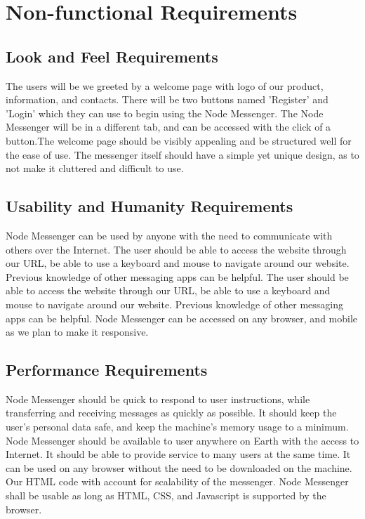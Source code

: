 \documentclass[12pt, titlepage]{article}
\begin{document}
    \section{Non-functional Requirements}

    	\subsection{Look and Feel Requirements}
    	The users will be we greeted by a welcome page with logo of our product, information, and contacts. There will be two buttons named 'Register' and 'Login' which they can use to begin using the Node Messenger. The Node Messenger will be in a different tab, and can be accessed with the click of a button.The welcome page should be visibly appealing and be structured well for the ease of use. The messenger itself should have a simple yet unique design, as to not make it cluttered and difficult to use.

    	\subsection{Usability and Humanity Requirements}
		Node Messenger can be used by anyone with the need to communicate with others over the Internet. The user should be able to access the website through our URL, be able to use a keyboard and mouse to navigate around our website. Previous knowledge of other messaging apps can be helpful. The user should be able to access the website through our URL, be able to use a keyboard and mouse to navigate around our website. Previous knowledge of other messaging apps can be helpful. Node Messenger can be accessed on any browser, and mobile as we plan to make it responsive.
    	\subsection{Performance Requirements}
		Node Messenger should be quick to respond to user instructions, while transferring and receiving messages as quickly as possible. It should keep the user's personal data safe, and keep the machine's memory usage to a minimum. Node Messenger should be available to user anywhere on Earth with the access to Internet. It should be able to provide service to many users at the same time. It can be used on any browser without the need to be downloaded on the machine. Our HTML code with account for scalability of the messenger. Node Messenger shall be usable as long as HTML, CSS, and Javascript is supported by the browser.
\end{document}
